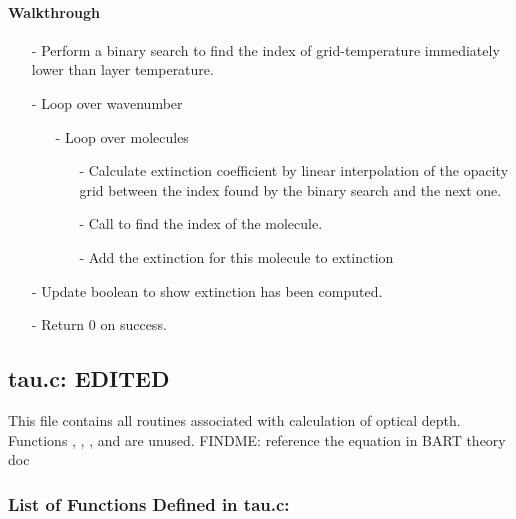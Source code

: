 \documentclass[letterpaper,12pt]{article}
\begin{document}
\paragraph{Walkthrough}
\begin{enumerate}[leftmargin=10pt, noitemsep, parsep=0pt, topsep=0ex]
\item[-] Perform a binary search to find the index of grid-temperature immediately lower than layer temperature.
\item[-] Loop over wavenumber
\begin{enumerate}[leftmargin=10pt, noitemsep, parsep=0pt, topsep=0ex]
\item[-] Loop over molecules
\begin{enumerate}[leftmargin=10pt, noitemsep, parsep=0pt, topsep=0ex]
\item[-] Calculate extinction coefficient by linear interpolation of the opacity grid between the index found by the binary search and the next one.
\item[-] Call  to find the index of the molecule.
\item[-] Add the extinction for this molecule to extinction
\end{enumerate}
\end{enumerate}
\item[-] Update boolean to show extinction has been computed.
\item[-] Return 0 on success.
\end{enumerate}

\newpage
\subsection{tau.c: EDITED}
This file contains all routines associated with calculation of optical depth. Functions , , , and  are unused.
FINDME: reference the equation in BART theory doc
\subsubsection{List of Functions Defined in tau.c:}

 \newline

 \newline
\end{document}
